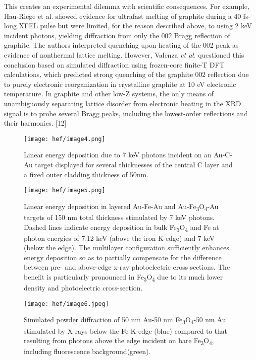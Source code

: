 This creates an experimental dilemma with scientific consequences. For
example, Hau-Riege et al. \cite{hau2012ultrafast} showed evidence for ultrafast melting
of graphite during a 40 fs-long XFEL pulse but were limited, for the
reason described above, to using 2 keV incident photons, yielding
diffraction from only the 002 Bragg reflection of graphite. The authors
interpreted quenching upon heating of the 002 peak as evidence of
nonthermal lattice melting. However, Valenza \emph{et al.} \cite{valenza2016warm}
questioned this conclusion based on simulated diffraction using
frozen-core finite-T DFT calculations, which predicted strong quenching
of the graphite 002 reflection due to purely electronic reorganization
in crystalline graphite at 10 eV electronic temperature. In graphite and
other low-Z systems, the only means of unambiguously separating lattice
disorder from electronic heating in the XRD signal is to probe several
Bragg peaks, including the lowest-order reflections and their harmonics.
{[}12{]}

\begin{figure}[h]
\caption{
Linear energy deposition due to 7 keV photons incident on an Au-C-Au
target displayed for several thicknesses of the central C layer and a
fixed outer cladding thickness of 50nm.
}
\label{fig:hef_image4}
\centering
\texttt{[image: hef/image4.png]}
\end{figure}

\begin{figure}[h]
\caption{
Linear energy deposition in layered Au-Fe-Au and
Au-Fe\textsubscript{3}O\textsubscript{4}-Au targets of 150 nm total
thickness stimulated by 7 keV photons. Dashed lines indicate energy
deposition in bulk Fe\textsubscript{3}O\textsubscript{4} and Fe at
photon energies of 7.12 keV (above the iron K-edge) and 7 keV (below the
edge). The multilayer configuration sufficiently enhances energy
deposition so as to partially compensate for the difference between pre-
and above-edge x-ray photoelectric cross sections. The benefit is
particularly pronounced in Fe\textsubscript{3}O\textsubscript{4} due to
its much lower density and photoelectric cross-section.
}
\label{fig:hef_image5}
\centering
\texttt{[image: hef/image5.png]}
\end{figure}

\begin{figure}[h]
\caption{
Simulated powder diffraction of 50 nm Au-50 nm
Fe\textsubscript{3}O\textsubscript{4}-50 nm Au stimulated by X-rays
below the Fe K-edge (blue) compared to that resulting from photons above
the edge incident on bare Fe\textsubscript{3}O\textsubscript{4},
including fluorescence background(green).
}
\label{fig:hef_image6}
\centering
\texttt{[image: hef/image6.jpeg]}
\end{figure}

